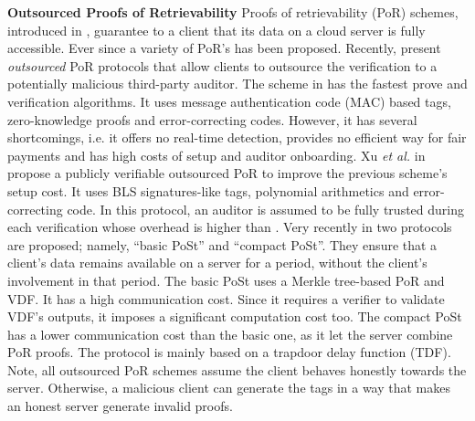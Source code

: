 

\noindent\textbf{Outsourced Proofs of Retrievability}
Proofs of retrievability (PoR) schemes, introduced in \cite{DBLP:conf/ccs/JuelsK07},  guarantee to a client that  its   data on a cloud server is fully accessible. Ever since  a variety of PoR's has been proposed.  Recently,  \cite{armknecht2014outsourced,xu2016lightweight} present  \emph{outsourced} PoR protocols that allow  clients to outsource the   verification to a potentially malicious third-party auditor. The scheme in \cite{armknecht2014outsourced}   has the fastest prove and verification algorithms. It uses message authentication code (MAC) based tags, zero-knowledge proofs and error-correcting codes. However, it  has  several shortcomings, i.e. it offers no real-time detection,  provides no efficient way for fair payments and  has high costs of setup and auditor onboarding.   Xu \textit{et al.} in \cite{xu2016lightweight} propose a publicly verifiable outsourced PoR to improve the previous scheme's setup cost. It uses   BLS signatures-like tags, polynomial arithmetics and error-correcting code.  In this protocol, an auditor is assumed to be fully trusted during each verification whose overhead is higher  than \cite{armknecht2014outsourced}. Very recently in \cite{Storage-Time} two protocols are proposed; namely, ``basic PoSt'' and ``compact PoSt''. They ensure that a client's data remains available on a   server for a   period, without the client's involvement  in that period.  The basic PoSt  uses a Merkle tree-based PoR and VDF. It has a high communication cost. Since it  requires a verifier to validate VDF's outputs, it imposes a significant computation cost too. The compact PoSt has a lower communication cost than the basic one, as it let the server combine PoR proofs. The protocol is mainly based on a trapdoor delay function (TDF). Note,  all  outsourced PoR schemes \cite{armknecht2014outsourced,xu2016lightweight,Storage-Time}  assume the client behaves honestly towards the server. Otherwise, a malicious client can generate the tags in a way that  makes an honest server generate invalid proofs. 


